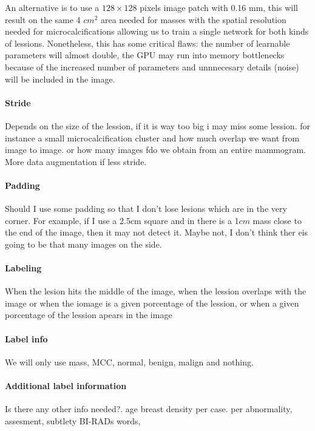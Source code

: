 An alternative is to use a $128 \times 128$ pixels image patch with 0.16 mm, this will result on the same 4 $cm^2$ area needed for masses with the spatial resolution needed for microcalcifications allowing us to train a single network for both kinds of lessions. Nonetheless, this has some critical flaws: the number of learnable parameters will almost double, the GPU may run into memory bottlenecks because of the increased number of parameters and unnnecesary details (noise) will be included in the image.

\paragraph{Stride}
Depends on the size of the lession, if it is way too big i may miss some lession. for instance a small microcalcification cluster
and how much overlap we want from image to image.
or how many images fdo we obtain from an entire mammogram.
More data augmentation if less stride.

\paragraph{Padding}
Should I use some padding so that I don't lose lesions which are in the very corner. For example, if I use a 2.5cm square and in there is a 1$cm$ mass close to the end of the image, then it may not detect it. Maybe not, I don't think ther eis going to be that many images on the side.

\paragraph{Labeling}
When the lesion hits the middle of the image, when the lession overlaps with the image or when the iomage is a given porcentage of the lession, or when a given porcentage of the lession apears in the image

\paragraph{Label info}
We will only use mass, MCC, normal, benign, malign and nothing.

\paragraph{Additional label information}
Is there any other info needed?. age breast density per case. per abnormality, assesment, subtlety BI-RADs words,  

